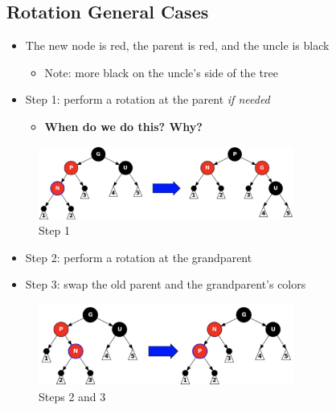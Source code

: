 \documentclass[
  10pt,
  english,
  letterpaper,
,tablecaptionabove
]{scrartcl}
\providecommand{\tightlist}{%
  \setlength{\itemsep}{0pt}\setlength{\parskip}{0pt}}
\begin{document}
\hypertarget{rotation-general-cases}{%
\subsection{Rotation General Cases}\label{rotation-general-cases}}

\begin{itemize}
\tightlist
\item
  The new node is red, the parent is red, and the uncle is black

  \begin{itemize}
  \tightlist
  \item
    Note: more black on the uncle's side of the tree
  \end{itemize}
\item
  Step 1: perform a rotation at the parent \emph{if needed}

  \begin{itemize}
  \tightlist
  \item
    \textbf{When do we do this? Why?}
  \end{itemize}
\end{itemize}

\begin{figure}
\centering
\includegraphics[width=0.75\textwidth,height=\textheight]{images/1.png}
\caption{Step 1}
\end{figure}

\begin{itemize}
\tightlist
\item
  Step 2: perform a rotation at the grandparent
\item
  Step 3: swap the old parent and the grandparent's colors
\end{itemize}

\begin{figure}
\centering
\includegraphics[width=0.75\textwidth,height=\textheight]{images/2.png}
\caption{Steps 2 and 3}
\end{figure}
\end{document}
